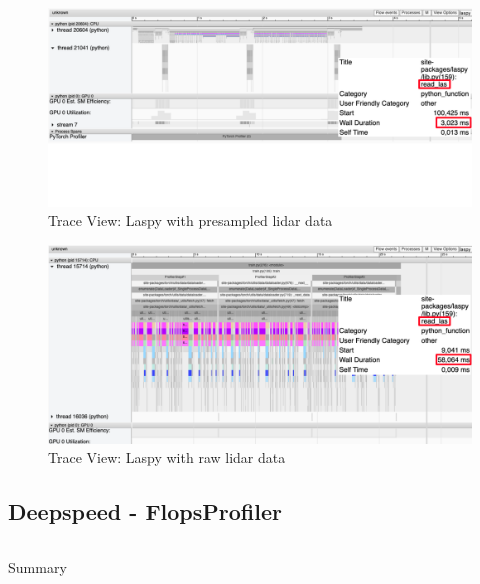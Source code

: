 \documentclass[12pt, a4paper, hidelinks]{article}
\begin{document}
\begin{figure}[H]
\centering
\includegraphics[width=1\textwidth]{./assets/scap_gtx1080_profiler-torch_batch-size-64_14650758_trace-view-laspy}
\caption*{Trace View: Laspy with presampled lidar data}
\label{fig:scap_gtx1080_profiler-torch_batch-size-64_14650758_trace-view-laspy}
\end{figure}

\begin{figure}[H]
\centering
\includegraphics[width=1\textwidth]{./assets/scap_gtx1080_profiler-torch_sample-points_14650750_trace-view-laspy}
\caption*{Trace View: Laspy with raw lidar data}
\label{fig:scap_gtx1080_profiler-torch_sample-points_14650750_trace-view-laspy}
\end{figure}



\subsection{Deepspeed - FlopsProfiler}
\label{sec:r-flopsprofiler}


\begin{listing}[H]
\inputminted[xleftmargin=1em,linenos,fontsize=\scriptsize, firstline=1,lastline=16]{python}{./assets/scap_gtx1080_deepspeed_14615344_4294967294_one-epoch.txt}
\caption{Summary}
\label{lst:scap_gtx1080_deepspeed_14615344_4294967294_one-epoch-summary}
\end{listing}
\end{document}

